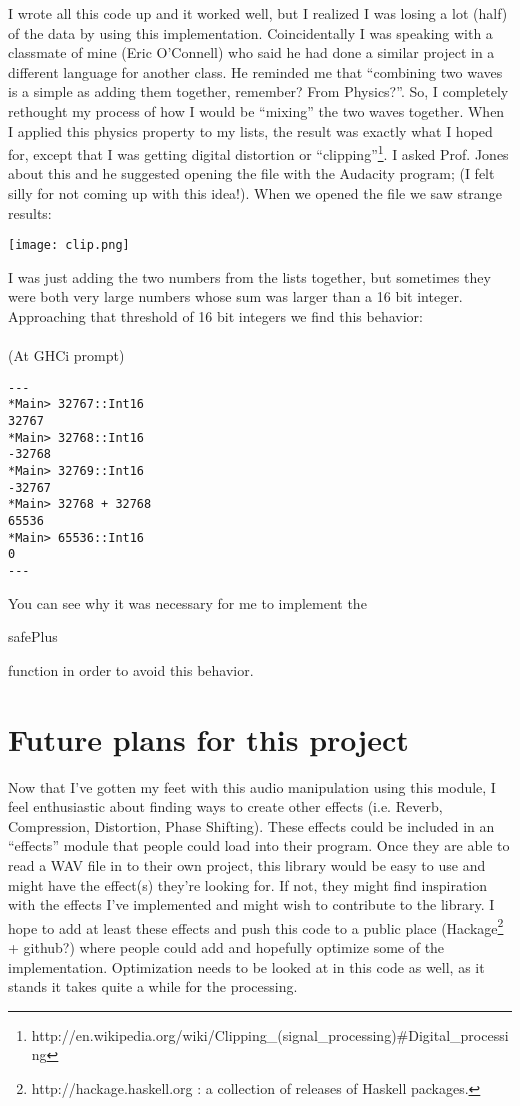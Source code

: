 \documentclass[12pt]{article}
\begin{document}
I wrote all this code up and it worked well, but I realized I was losing a lot (half) of the data by using this implementation. Coincidentally I was speaking with a classmate of mine (Eric O'Connell) who said he had done a similar project in a different language for another class. He reminded me that ``combining two waves is a simple as adding them together, remember? From Physics?''. So, I completely rethought my process of how I would be ``mixing'' the two waves together. When I applied this physics property to my lists, the result was exactly what I hoped for, except that I was getting digital distortion or ``clipping''\footnote{http://en.wikipedia.org/wiki/Clipping\_(signal\_processing)\#Digital\_processing}. I asked Prof. Jones about this and he suggested opening the file with the Audacity program; (I felt silly for not coming up with this idea!). When we opened the file we saw strange results:
\begin{center}
\texttt{[image: clip.png]}
\end{center}
I was just adding the two numbers from the lists together, but sometimes they were both very large numbers whose sum was larger than a 16 bit integer. Approaching that threshold of 16 bit integers we find this behavior:
\\ \\
(At GHCi prompt)
\begin{verbatim}
---
*Main> 32767::Int16
32767
*Main> 32768::Int16
-32768
*Main> 32769::Int16
-32767
*Main> 32768 + 32768
65536
*Main> 65536::Int16
0
---
\end{verbatim}
You can see why it was necessary for me to implement the \begin{tt}safePlus\end{tt}
function in order to avoid this behavior.




\section{Future plans for this project}
Now that I've gotten my feet with this audio manipulation using this module, I feel enthusiastic about finding ways to create other effects (i.e. Reverb, Compression, Distortion, Phase Shifting). These effects could be included in an ``effects'' module that people could load into their program. Once they are able to read a WAV file in to their own project, this library would be easy to use and might have the effect(s) they're looking for. If not, they might find inspiration with the effects I've implemented and might wish to contribute to the library. I hope to add at least these effects and push this code to a public place (Hackage\footnote{http://hackage.haskell.org : a collection of releases of Haskell packages.} + github?) where people could add and hopefully optimize some of the implementation. Optimization needs to be looked at in this code as well, as it stands it takes quite a while for the processing.
\newpage
\end{document}
